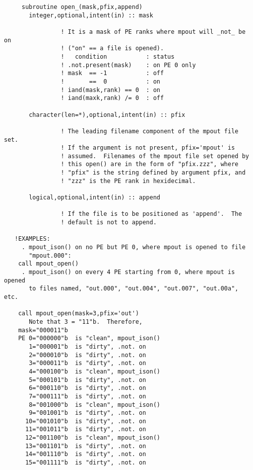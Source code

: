 \begin{verbatim} 
     subroutine open_(mask,pfix,append)
       integer,optional,intent(in) :: mask
 
                ! It is a mask of PE ranks where mpout will _not_ be on
                ! ("on" == a file is opened).
                !   condition           : status
                ! .not.present(mask)    : on PE 0 only
                ! mask  == -1           : off
                !       ==  0           : on
                ! iand(mask,rank) == 0  : on
                ! iand(maxk,rank) /= 0  : off
 
       character(len=*),optional,intent(in) :: pfix
 
                ! The leading filename component of the mpout file set.
                ! If the argument is not present, pfix='mpout' is
                ! assumed.  Filenames of the mpout file set opened by
                ! this open() are in the form of "pfix.zzz", where
                ! "pfix" is the string defined by argument pfix, and
                ! "zzz" is the PE rank in hexidecimal.
 
       logical,optional,intent(in) :: append
 
                ! If the file is to be positioned as 'append'.  The
                ! default is not to append.
 
   !EXAMPLES:
     . mpout_ison() on no PE but PE 0, where mpout is opened to file
       "mpout.000":
  	call mpout_open()
     . mpout_ison() on every 4 PE starting from 0, where mpout is opened
       to files named, "out.000", "out.004", "out.007", "out.00a", etc.
 
  	call mpout_open(mask=3,pfix='out')
       Note that 3 = "11"b.  Therefore,
  	mask="000011"b
  	PE 0="000000"b	is "clean", mpout_ison()
  	   1="000001"b	is "dirty", .not. on
  	   2="000010"b	is "dirty", .not. on
  	   3="000011"b	is "dirty", .not. on
  	   4="000100"b	is "clean", mpout_ison()
  	   5="000101"b	is "dirty", .not. on
  	   6="000110"b	is "dirty", .not. on
  	   7="000111"b	is "dirty", .not. on
  	   8="001000"b	is "clean", mpout_ison()
  	   9="001001"b	is "dirty", .not. on
  	  10="001010"b	is "dirty", .not. on
  	  11="001011"b	is "dirty", .not. on
  	  12="001100"b	is "clean", mpout_ison()
  	  13="001101"b	is "dirty", .not. on
  	  14="001110"b	is "dirty", .not. on
  	  15="001111"b	is "dirty", .not. on\end{verbatim}%
 
